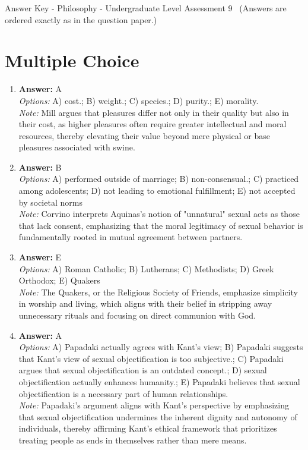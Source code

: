 \documentclass[12pt]{article}
\begin{document}
\begin{center}
Answer Key - Philosophy - Undergraduate Level Assessment 9 \
\small (Answers are ordered exactly as in the question paper.)
\end{center}

\section*{Multiple Choice}
\begin{enumerate}[label=\arabic*.]
\item \textbf{Answer:} A
\\ \textit{Options:} A) cost.; B) weight.; C) species.; D) purity.; E) morality.
\\ \textit{Note:} Mill argues that pleasures differ not only in their quality but also in their cost, as higher pleasures often require greater intellectual and moral resources, thereby elevating their value beyond mere physical or base pleasures associated with swine.
\item \textbf{Answer:} B
\\ \textit{Options:} A) performed outside of marriage; B) non-consensual.; C) practiced among adolescents; D) not leading to emotional fulfillment; E) not accepted by societal norms
\\ \textit{Note:} Corvino interprets Aquinas's notion of "unnatural" sexual acts as those that lack consent, emphasizing that the moral legitimacy of sexual behavior is fundamentally rooted in mutual agreement between partners.
\item \textbf{Answer:} E
\\ \textit{Options:} A) Roman Catholic; B) Lutherans; C) Methodists; D) Greek Orthodox; E) Quakers
\\ \textit{Note:} The Quakers, or the Religious Society of Friends, emphasize simplicity in worship and living, which aligns with their belief in stripping away unnecessary rituals and focusing on direct communion with God.
\item \textbf{Answer:} A
\\ \textit{Options:} A) Papadaki actually agrees with Kant's view; B) Papadaki suggests that Kant's view of sexual objectification is too subjective.; C) Papadaki argues that sexual objectification is an outdated concept.; D) sexual objectification actually enhances humanity.; E) Papadaki believes that sexual objectification is a necessary part of human relationships.
\\ \textit{Note:} Papadaki's argument aligns with Kant's perspective by emphasizing that sexual objectification undermines the inherent dignity and autonomy of individuals, thereby affirming Kant's ethical framework that prioritizes treating people as ends in themselves rather than mere means.

\end{enumerate}
\end{document}
